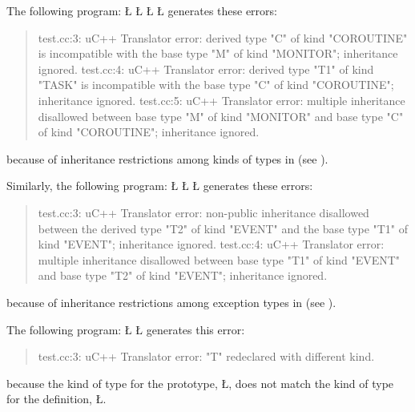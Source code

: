 \documentclass[openright,twoside]{report}
\begin{document}
The following program:
\LGinlinefalse\LGbegin\lgrinde
\L{}
\L{}
\L{}
\L{}
\endlgrinde\LGend
generates these errors:
\begin{quote}
\BGfont
test.cc:3: uC++ Translator error: derived type "C" of kind "COROUTINE" is incompatible with the base type "M" of kind "MONITOR"; inheritance ignored.
\newline
test.cc:4: uC++ Translator error: derived type "T1" of kind "TASK" is incompatible with the base type "C" of kind "COROUTINE"; inheritance ignored.
\newline
test.cc:5: uC++ Translator error: multiple inheritance disallowed between base type "M" of kind "MONITOR" and base type "C" of kind "COROUTINE"; inheritance ignored.
\end{quote}
because of inheritance restrictions among kinds of types in \uC (see ).

Similarly, the following program:
\LGinlinefalse\LGbegin\lgrinde
\L{}
\L{}
\L{}
\endlgrinde\LGend
generates these errors:
\begin{quote}
\BGfont
test.cc:3: uC++ Translator error: non-public inheritance disallowed between the derived type "T2" of kind "EVENT" and the base type "T1" of kind "EVENT"; inheritance ignored.
\newline
test.cc:4: uC++ Translator error: multiple inheritance disallowed between base type "T1" of kind "EVENT" and base type "T2" of kind "EVENT"; inheritance ignored.
\end{quote}
because of inheritance restrictions among exception types in \uC (see ).

The following program:
\LGinlinefalse\LGbegin\lgrinde
\L{}
\CE{}\L{}
\CE{}\endlgrinde\LGend
generates this error:
\begin{quote}
\BGfont
test.cc:3: uC++ Translator error: "T" redeclared with different kind.
\end{quote}
because the kind of type for the prototype, \LGinlinetrue\LGbegin\lgrinde\L{}\endlgrinde\LGend{}, does not match the kind of type for the definition, \LGinlinetrue\LGbegin\lgrinde\L{}\endlgrinde\LGend{}.
\end{document}
